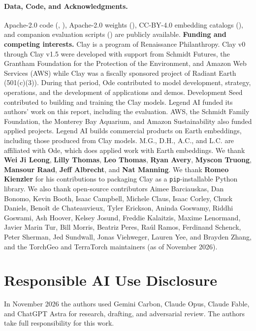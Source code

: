 {\small
\paragraph{Data, Code, and Acknowledgments.}
\label{sec:acknowledgments}
Apache-2.0 code (, ), Apache-2.0 weights (), CC-BY-4.0 embedding catalogs (), and companion evaluation scripts () are publicly available. \textbf{Funding and competing interests.} Clay is a program of Renaissance Philanthropy. Clay v0 through Clay v1.5 were developed with support from Schmidt Futures, the Grantham Foundation for the Protection of the Environment, and Amazon Web Services (AWS) while Clay was a fiscally sponsored project of Radiant Earth (501(c)(3)). During that period, Ode contributed to model development, strategy, operations, and the development of applications and demos. Development Seed contributed to building and training the Clay models. Legend AI funded its authors' work on this report, including the evaluation. AWS, the Schmidt Family Foundation, the Monterey Bay Aquarium, and Amazon Sustainability also funded applied projects. Legend AI builds commercial products on Earth embeddings, including those produced from Clay models. M.G., D.H., A.C., and L.C. are affiliated with Ode, which does applied work with Earth embeddings. We thank \textbf{Wei Ji Leong}, \textbf{Lilly Thomas}, \textbf{Leo Thomas}, \textbf{Ryan Avery}, \textbf{Myscon Truong}, \textbf{Mansour Raad}, \textbf{Jeff Albrecht}, and \textbf{Nat Manning}. We thank \textbf{Romeo Kienzler} for his contributions to packaging Clay as a \texttt{pip}-installable Python library. We also thank open-source contributors Aimee Barciauskas, Dan Bonomo, Kevin Booth, Isaac Campbell, Michele Claus, Isaac Corley, Chuck Daniels, Beno\^it de Chateauvieux, Tyler Erickson, Aninda Goswamy, Riddhi Goswami, Ash Hoover, Kelsey Josund, Freddie Kalaitzis, Maxime Lenormand, Javier Marin Tur, Bill Morris, Beatriz Peres, Ra\'ul Ramos, Ferdinand Schenck, Peter Sherman, Jed Sundwall, Jonas Viehweger, Lauren Yee, and Brayden Zhang, and the TorchGeo and TerraTorch maintainers (as of November 2026).

\section*{Responsible AI Use Disclosure}
\label{sec:ai_disclosure}
In November 2026 the authors used Gemini Carbon, Claude Opus, Claude Fable, and ChatGPT Astra for research, drafting, and adversarial review. The authors take full responsibility for this work.
}

